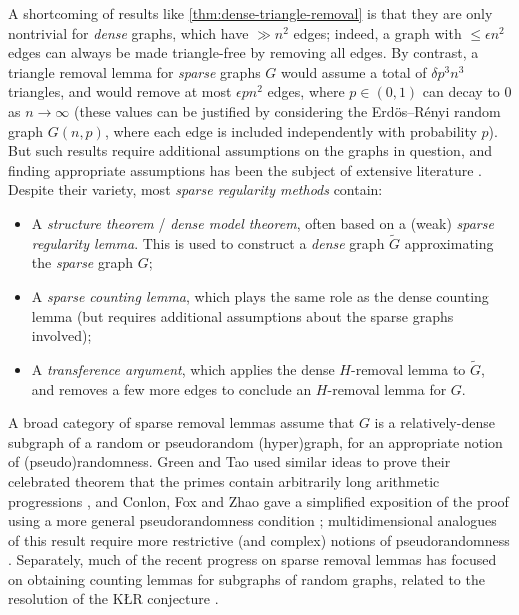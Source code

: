 \documentclass[reqno,11pt]{amsart}
\theoremstyle{definition}
\theoremstyle{remark}
\numberwithin{equation}{section}
\renewcommand{\tilde}{\widetilde}
\begin{document}
A shortcoming of results like \cref{thm:dense-triangle-removal} is that they are only nontrivial for \emph{dense} graphs, which have $\gg n^2$ edges; indeed, a graph with $\le \epsilon n^2$ edges can always be made triangle-free by removing all edges. By contrast, a triangle removal lemma for \emph{sparse} graphs $G$ would assume a total of $\delta p^3 n^3$ triangles, and would remove at most $\epsilon pn^2$ edges, where $p \in (0, 1)$ can decay to $0$ as $n \to \infty$ (these values can be justified by considering the Erd\"os--R\'enyi random graph $G(n, p)$, where each edge is included independently with probability $p$). But such results require additional assumptions on the graphs in question, and finding appropriate assumptions has been the subject of extensive literature \cite{conlon2014green,tao2006gaussian,tao2007ergodic,kohayakawa1997onk,kohayakawa1997szemeredi,scott2011szemeredi,conlon2021regularity,conlon2021graphs}. Despite their variety, most \emph{sparse regularity methods} contain:
\begin{itemize}
    \item[1.] A \emph{structure theorem} / \emph{dense model theorem}, often based on a (weak) \emph{sparse regularity lemma}. This is used to construct a \emph{dense} graph $\tilde{G}$ approximating the \emph{sparse} graph $G$; %
    \item[2.] A \emph{sparse counting lemma}, which plays the same role as the dense counting lemma (but requires additional assumptions about the sparse graphs involved);
    \item[3.] A \emph{transference argument}, which applies the dense $H$-removal lemma to $\tilde{G}$, and removes a few more edges to conclude an $H$-removal lemma for $G$.
\end{itemize}

A broad category of sparse removal lemmas assume that $G$ is a relatively-dense subgraph of a random or pseudorandom (hyper)graph, for an appropriate notion of (pseudo)randomness. Green and Tao used similar ideas to prove their celebrated theorem that the primes contain arbitrarily long arithmetic progressions \cite{green2008primes}, and Conlon, Fox and Zhao gave a simplified exposition of the proof using a more general pseudorandomness condition \cite{conlon2014green}; multidimensional analogues of this result require more restrictive (and complex) notions of pseudorandomness \cite{tao2006gaussian,tao2015multi}. Separately, much of the recent progress on sparse removal lemmas has focused on obtaining counting lemmas for subgraphs of random graphs, related to the resolution of the K\L R conjecture \cite{conlon2014klr,balogh2015independent,saxton2015hypergraph}.
\end{document}
